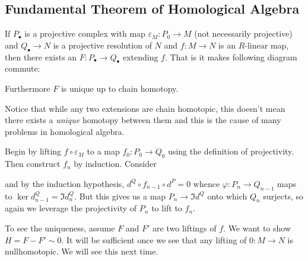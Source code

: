 \documentclass[12pt]{article}
\begin{document}
\subsection*{Fundamental Theorem of Homological Algebra}
\begin{thm}
	If $P_\bullet$ is a projective complex with map $\varepsilon_M:P_0\to M$ (not necessarily projective) and $Q_\bullet\to N$ is a projective 
	resolution of $N$ and $f:M\to N$ is an $R$-linear map, then there exists an $F:P_\bullet \to Q_\bullet$ 
	extending $f$. That is it makes following diagram commute:
	\begin{center}
	\end{center}

	Furthermore $F$ is unique up to chain homotopy.
\end{thm}
\begin{rmk}
	Notice that while any two extensions are chain homotopic, this doesn't mean there exists
	a \textit{unique} homotopy between them and this is the cause of many problems in homological algebra.
\end{rmk}
\begin{prf}
	Begin by lifting $f\circ \varepsilon_M$ to a map $f_0:P_0\to Q_0$ using the definition of projectivity.
	Then construct $f_n$ by induction. Consider
	\begin{center}
	\end{center}
	and by the induction hypothesis, $d^Q\circ f_{n-1}\circ d^P=0$ whence $\varphi:P_n\to Q_{n-1}$ 
	maps to $\ker d^Q_{n-1}=\Im d^Q_n$. But this gives us a map $P_n\to \Im d^Q$ onto which $Q_n$ surjects,
	so again we leverage the projectivity of $P_n$ to lift to $f_n$.

	To see the uniqueness, assume $F$ and $F'$ are two liftings of $f$. We want to show $H=F-F'\sim 0$.
	It will be sufficient once we see that any lifting of $0:M\to N$ is nullhomotopic. We will see this next time.
\end{prf}
\end{document}
